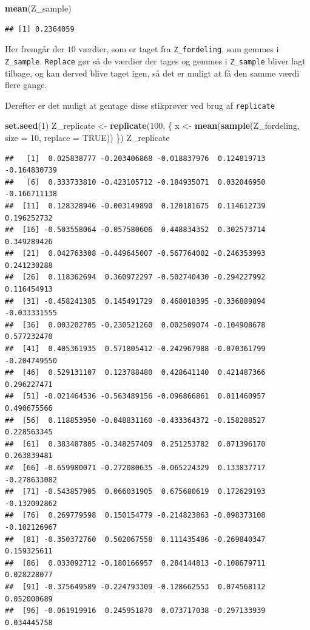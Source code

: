 \documentclass[
]{book}
\newenvironment{Shaded}{\begin{snugshade}}{\end{snugshade}}
\newcommand{\DataTypeTok}[1]{\textcolor[rgb]{0.13,0.29,0.53}{#1}}
\newcommand{\DecValTok}[1]{\textcolor[rgb]{0.00,0.00,0.81}{#1}}
\newcommand{\KeywordTok}[1]{\textcolor[rgb]{0.13,0.29,0.53}{\textbf{#1}}}
\newcommand{\NormalTok}[1]{#1}
\newcommand{\OtherTok}[1]{\textcolor[rgb]{0.56,0.35,0.01}{#1}}
\newcommand{\StringTok}[1]{\textcolor[rgb]{0.31,0.60,0.02}{#1}}
\theoremstyle{definition}
\theoremstyle{definition}
\theoremstyle{definition}
\theoremstyle{remark}
\begin{document}
\begin{Shaded}
\begin{Highlighting}[]
\KeywordTok{mean}\NormalTok{(Z_sample)}
\end{Highlighting}
\end{Shaded}

\begin{verbatim}
## [1] 0.2364059
\end{verbatim}

Her fremgår der \(10\) værdier, som er taget fra \texttt{Z\_fordeling}, som gemmes i \texttt{Z\_sample}. \texttt{Replace} gør så de værdier der tages og gemmes i \texttt{Z\_sample} bliver lagt tilbage, og kan derved blive taget igen, så det er muligt at få den samme værdi flere gange.

Derefter er det muligt at gentage disse stikprøver ved brug af \texttt{replicate}

\begin{Shaded}
\begin{Highlighting}[]
\KeywordTok{set.seed}\NormalTok{(}\DecValTok{1}\NormalTok{)}
\NormalTok{Z_replicate <-}\StringTok{ }\KeywordTok{replicate}\NormalTok{(}\DecValTok{100}\NormalTok{, \{}
\NormalTok{  x <-}\StringTok{ }\KeywordTok{mean}\NormalTok{(}\KeywordTok{sample}\NormalTok{(Z_fordeling, }\DataTypeTok{size =} \DecValTok{10}\NormalTok{, }\DataTypeTok{replace =} \OtherTok{TRUE}\NormalTok{))}
\NormalTok{\})}
\NormalTok{Z_replicate}
\end{Highlighting}
\end{Shaded}

\begin{verbatim}
##   [1]  0.025838777 -0.203406868 -0.018837976  0.124819713 -0.164830739
##   [6]  0.333733810 -0.423105712 -0.184935071  0.032046950 -0.166711138
##  [11]  0.128328946 -0.003149890  0.120181675  0.114612739  0.196252732
##  [16] -0.503558064 -0.057580606  0.448834352  0.302573714  0.349289426
##  [21]  0.042763308 -0.449645007 -0.567764002 -0.246353993  0.241230288
##  [26]  0.118362694  0.360972297 -0.502740430 -0.294227992  0.116454913
##  [31] -0.458241385  0.145491729  0.468018395 -0.336889894 -0.033331555
##  [36]  0.003202705 -0.230521260  0.002509074 -0.104908678  0.577232470
##  [41]  0.405361935  0.571805412 -0.242967988 -0.070361799 -0.204749550
##  [46]  0.529131107  0.123788480  0.428641140  0.421487366  0.296227471
##  [51] -0.021464536 -0.563489156 -0.096866861  0.011460957  0.490675566
##  [56]  0.118853950 -0.048831160 -0.433364372 -0.158288527  0.228563345
##  [61]  0.383487805 -0.348257409  0.251253782  0.071396170  0.263839481
##  [66] -0.659980071 -0.272080635 -0.065224329  0.133837717 -0.278633082
##  [71] -0.543857905  0.066031905  0.675680619  0.172629193 -0.132092862
##  [76]  0.269779598  0.150154779 -0.214823863 -0.098373108 -0.102126967
##  [81] -0.350372760  0.502067558  0.111435486 -0.269840347  0.159325611
##  [86]  0.033092712 -0.180166957  0.284144813 -0.108679711  0.028228077
##  [91] -0.375649589 -0.224793309 -0.128662553  0.074568112  0.052000689
##  [96] -0.061919916  0.245951870  0.073717038 -0.297133939  0.034445758
\end{verbatim}
\end{document}
